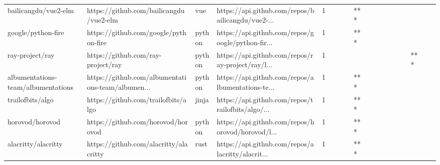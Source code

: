 \begin{tabular}{llllrlllllllllllll}
bailicangdu/vue2-elm                               &            https://github.com/bailicangdu/vue2-elm &               vue &  https://api.github.com/repos/bailicangdu/vue2-... &       1 &         &        &           &            *** &                 &        &           &           &          &          &       &              &          \\
google/python-fire                                 &              https://github.com/google/python-fire &            python &  https://api.github.com/repos/google/python-fir... &       1 &         &        &           &            *** &                 &        &           &           &          &          &       &              &          \\
ray-project/ray                                    &                 https://github.com/ray-project/ray &            python &  https://api.github.com/repos/ray-project/ray/l... &       1 &         &        &           &                &                 &        &           &           &          &          &   *** &              &          \\
albumentations-team/albumentations                 &  https://github.com/albumentations-team/albumen... &            python &  https://api.github.com/repos/albumentations-te... &       1 &         &        &           &            *** &                 &        &           &           &          &          &       &              &          \\
trailofbits/algo                                   &                https://github.com/trailofbits/algo &             jinja &  https://api.github.com/repos/trailofbits/algo/... &       1 &         &        &           &            *** &                 &        &           &           &          &          &       &              &          \\
horovod/horovod                                    &                 https://github.com/horovod/horovod &            python &  https://api.github.com/repos/horovod/horovod/l... &       1 &         &        &           &            *** &                 &        &           &           &          &          &       &              &          \\
alacritty/alacritty                                &             https://github.com/alacritty/alacritty &              rust &  https://api.github.com/repos/alacritty/alacrit... &       1 &         &        &           &            *** &                 &        &           &           &          &          &       &              &          \\

\end{tabular}
